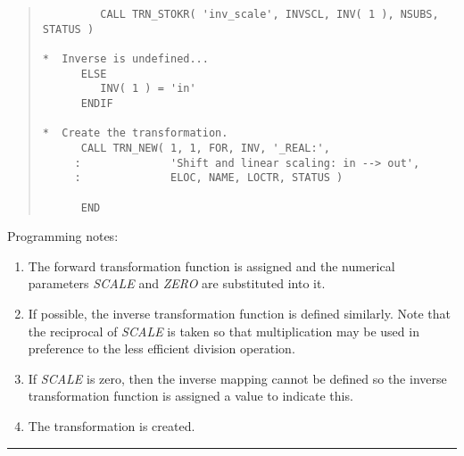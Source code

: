 \documentclass[twoside,11pt]{article}
\newcommand{\fortvar}[1]{\mbox{\emph{#1}}}
\newcommand{\numcir}[1]{\mbox{\hspace{3ex}\fbox{#1}}}
\newcommand{\exampledone}[0]{\begin{center} \rule{6em}{0.2mm} \end{center}}
\begin{document}
\begin{quote}
\begin{tabbing}
\verb#         CALL TRN_STOKR( 'inv_scale', INVSCL, INV( 1 ), NSUBS, STATUS )#\\
\verb#                                                       #\\
\verb#*  Inverse is undefined...                             #\\
\verb#      ELSE                                             #\\
\verb#         INV( 1 ) = 'in'                               #\numcir{3}\\
\verb#      ENDIF                                            #\\
\verb#                                                       #\\
\verb#*  Create the transformation.                          #\\
\verb#      CALL TRN_NEW( 1, 1, FOR, INV, '_REAL:',          #\numcir{4}\\
\verb#     :              'Shift and linear scaling: in --> out',#\\
\verb#     :              ELOC, NAME, LOCTR, STATUS )        #\\
\verb#                                                       #\\
\verb#      END                                              #

\end{tabbing}
\end{quote}

Programming notes:

\begin{enumerate}

\item The forward transformation function is assigned and the numerical
parameters \fortvar{SCALE} and \fortvar{ZERO} are substituted into it. 

\item If possible, the inverse transformation function is defined similarly.
Note that the reciprocal of \fortvar{SCALE} is taken so that multiplication
may be used in preference to the less efficient division operation. 

\item If \fortvar{SCALE} is zero, then the inverse mapping cannot be defined
so the inverse transformation function is assigned a value to indicate this.

\item The transformation is created.

\end{enumerate}
\exampledone
\end{document}
